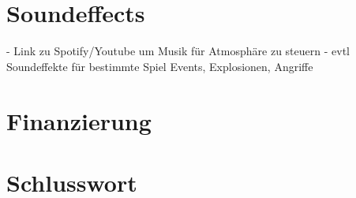 \documentclass[11pt]{article}
\begin{document}
    \section{Soundeffects}\label{sec:soundeffects}
    - Link zu Spotify/Youtube um Musik für Atmosphäre zu steuern
    - evtl Soundeffekte für bestimmte Spiel Events, Explosionen, Angriffe
    
    \section{Finanzierung}\label{sec:chapter_financials}


    \section{Schlusswort}\label{sec:chapter_finish}
\end{document}
